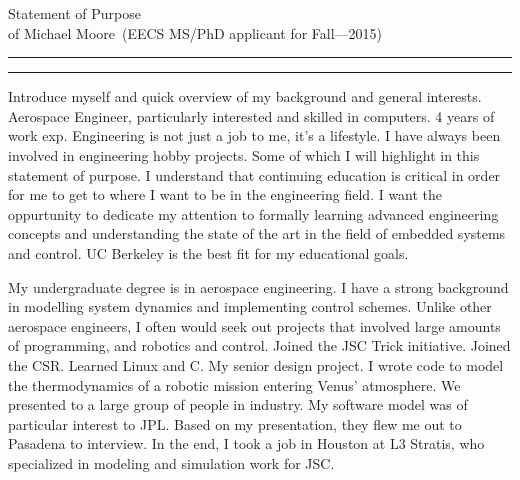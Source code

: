 \documentclass{article}
\newcommand{\soptitle}{Statement of Purpose}
\newcommand{\yourname}{Michael Moore}
\begin{document}
\begin{center}\LARGE\soptitle\\
\large of \yourname\ (EECS MS/PhD applicant for Fall---2015)
\end{center}

\hrule
\vspace{1pt}
\hrule height 1pt

\bigskip

Introduce myself and quick overview of my background and general interests.
Aerospace Engineer, particularly interested and skilled in computers. 4 years of work exp.
Engineering is not just a job to me, it's a lifestyle. I have always been 
involved in engineering hobby projects. Some of which I will highlight in this 
statement of purpose.
I understand that continuing education is critical in order for me to get to where I want to 
be in the engineering field. I want the oppurtunity to dedicate my attention to formally learning advanced
engineering concepts and understanding the state of the art in the field of embedded systems and control.
UC Berkeley is the best fit for my educational goals.


My undergraduate degree is in aerospace engineering. I have a strong background in modelling 
system dynamics and implementing control schemes.
Unlike other aerospace engineers, I often would seek out projects that involved large amounts of 
programming, and robotics and control.
Joined the JSC Trick initiative.
Joined the CSR. Learned Linux and C. 
My senior design project. I wrote code to model the thermodynamics of a robotic mission entering 
Venus' atmosphere. We presented to a large group of people in industry. My software model was of 
particular interest to JPL. Based on my presentation, they flew me out to Pasadena to interview. In the end,
I took a job in Houston at L3 Stratis, who specialized in modeling and simulation work for JSC.
\end{document}
